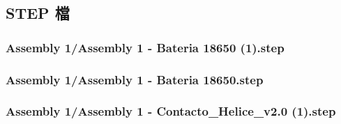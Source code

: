 \documentclass[a4paper,12pt]{article}
\begin{document}
\begin{center}\begin{figure}[H]\centering{}\end{figure}\FloatBarrier\end{center}
\begin{center}\begin{figure}[H]\centering{}\end{figure}\FloatBarrier\end{center}
\begin{center}\begin{figure}[H]\centering{}\end{figure}\FloatBarrier\end{center}
\begin{center}\begin{figure}[H]\centering{}\end{figure}\FloatBarrier\end{center}
\begin{center}\begin{figure}[H]\centering{}\end{figure}\FloatBarrier\end{center}
\subsection{STEP 檔}
\subsubsection{Assembly 1/Assembly 1 - Bateria 18650 (1).step}

\subsubsection{Assembly 1/Assembly 1 - Bateria 18650.step}

\subsubsection{Assembly 1/Assembly 1 - Contacto_Helice_v2.0 (1).step}

\end{document}
